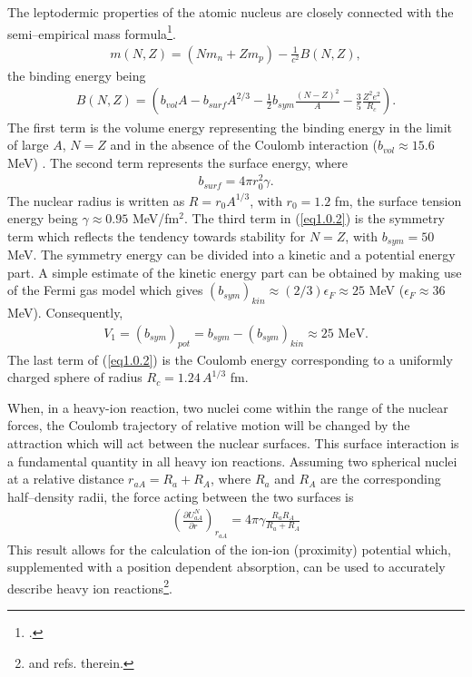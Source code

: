 The leptodermic properties of the atomic nucleus are closely connected with the semi--empirical mass formula\footnote{\cite{Weizsacker:35}.}.
\begin{align}
m(N,Z)=(Nm_n+Zm_p)-\frac{1}{c^2}B(N,Z),
\end{align}
the binding energy being
\begin{align}\label{eq1.0.2}
B(N,Z)=\left(b_{vol}A-b_{surf}A^{2/3}-\frac{1}{2} b_{sym}\frac{(N-Z)^2}{A}-\frac{3}{5}\frac{Z^2e^2}{R_c}\right).
\end{align}
The first term is the volume energy representing the binding energy in the limit of large $A$, $N=Z$ and in the absence of the Coulomb interaction ($b_{vol}\approx15.6$ MeV) . The second term represents the surface energy, where
\begin{align}\label{eq1.0.3}
b_{surf}=4\pi r_0^2\gamma.
\end{align}
The nuclear radius is written as $R=r_0A^{1/3}$, with $r_0=1.2$ fm, the surface tension energy being $\gamma\approx 0.95$ MeV/fm$^2$. 
The third term in (\ref{eq1.0.2}) is the symmetry term which reflects the tendency towards stability for $N=Z$, with $b_{sym}=50$ MeV. The symmetry energy can be divided into a kinetic and a potential energy part. A simple estimate of the kinetic energy part can be obtained by making use of the Fermi gas model which gives $(b_{sym})_{kin}\approx(2/3)\epsilon_F\approx25$ MeV ($\epsilon_F\approx 36$ MeV). Consequently,
\begin{align}\label{eq1.0.4bis}
V_1=(b_{sym})_{pot}=b_{sym}-(b_{sym})_{kin}\approx 25\text{ MeV}.
\end{align}
The last term of (\ref{eq1.0.2}) is the Coulomb energy corresponding to a uniformly charged sphere of radius $R_c=1.24\,A^{1/3}$ fm.


When, in a heavy-ion reaction,  two nuclei come within the range of the nuclear forces, the Coulomb  trajectory of relative motion will be changed by the attraction which will act between the nuclear surfaces. This surface interaction is a fundamental quantity in all heavy ion reactions. Assuming two spherical nuclei at a relative distance $r_{aA}=R_a+R_A$, where $R_a$ and $R_A$ are the corresponding half--density radii, the force acting between the two surfaces is
\begin{align}\label{eq1.0.4}
\left(\frac{\partial U_{aA}^N}{\partial r}\right)_{r_{aA}}=4\pi \gamma\frac{R_aR_A}{R_a+R_A}
\end{align}
This result allows for the calculation of the ion-ion (proximity) potential which, supplemented with a position dependent absorption, can be used to accurately describe heavy ion reactions\footnote{\cite{Broglia:04a} and refs. therein.}.


